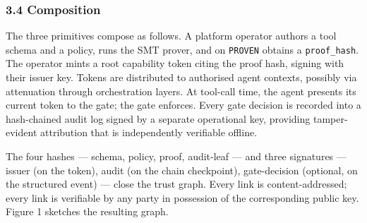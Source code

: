 \subsubsection{3.4 Composition}\label{composition}

The three primitives compose as follows. A platform operator authors a
tool schema and a policy, runs the SMT prover, and on \texttt{PROVEN}
obtains a \texttt{proof\_hash}. The operator mints a root capability
token citing the proof hash, signing with their issuer key. Tokens are
distributed to authorised agent contexts, possibly via attenuation
through orchestration layers. At tool-call time, the agent presents its
current token to the gate; the gate enforces. Every gate decision is
recorded into a hash-chained audit log signed by a separate operational
key, providing tamper-evident attribution that is independently
verifiable offline.

The four hashes --- schema, policy, proof, audit-leaf --- and three
signatures --- issuer (on the token), audit (on the chain checkpoint),
gate-decision (optional, on the structured event) --- close the trust
graph. Every link is content-addressed; every link is verifiable by any
party in possession of the corresponding public key. Figure 1 sketches
the resulting graph.

